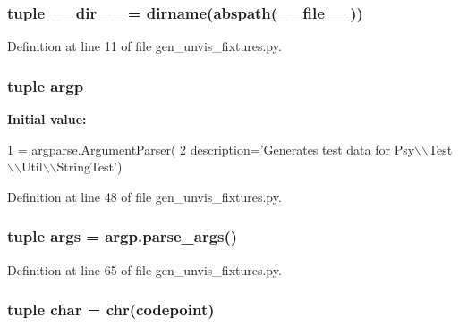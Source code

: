 \subsubsection[{\+\_\+\+\_\+dir\+\_\+\+\_\+}]{\setlength{\rightskip}{0pt plus 5cm}tuple \+\_\+\+\_\+dir\+\_\+\+\_\+ = dirname(abspath(\+\_\+\+\_\+file\+\_\+\+\_\+))}\label{namespacegen__unvis__fixtures_a78ce97d22bd0d4c2f213faa0cc449436}


Definition at line 11 of file gen\+\_\+unvis\+\_\+fixtures.\+py.

\subsubsection[{argp}]{\setlength{\rightskip}{0pt plus 5cm}tuple argp}\label{namespacegen__unvis__fixtures_a529dd9ecfd89891e1788f3a6b697f928}
{\bfseries Initial value\+:}
\begin{DoxyCode}
1 = argparse.ArgumentParser(
2         description=\textcolor{stringliteral}{'Generates test data for Psy\(\backslash\)\(\backslash\)Test\(\backslash\)\(\backslash\)Util\(\backslash\)\(\backslash\)StringTest'})
\end{DoxyCode}


Definition at line 48 of file gen\+\_\+unvis\+\_\+fixtures.\+py.

\subsubsection[{args}]{\setlength{\rightskip}{0pt plus 5cm}tuple args = argp.\+parse\+\_\+args()}\label{namespacegen__unvis__fixtures_aad3cdfd6574de97bf37448087aaff11d}


Definition at line 65 of file gen\+\_\+unvis\+\_\+fixtures.\+py.

\subsubsection[{char}]{\setlength{\rightskip}{0pt plus 5cm}tuple char = chr(codepoint)}\label{namespacegen__unvis__fixtures_a52e4057dda28bf1dd47acdf957399603}


